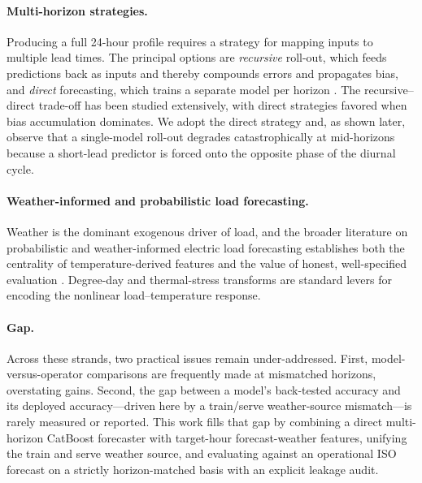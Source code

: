 \paragraph{Multi-horizon strategies.} Producing a full 24-hour profile requires
a strategy for mapping inputs to multiple lead times. The principal options are
\emph{recursive} roll-out, which feeds predictions back as inputs and thereby
compounds errors and propagates bias, and \emph{direct} forecasting, which
trains a separate model per horizon \cite{taieb2016bias}. The recursive--direct
trade-off has been studied extensively, with direct strategies favored when bias
accumulation dominates. We adopt the direct strategy and, as shown later,
observe that a single-model roll-out degrades catastrophically at mid-horizons
because a short-lead predictor is forced onto the opposite phase of the diurnal
cycle.

\paragraph{Weather-informed and probabilistic load forecasting.} Weather is the
dominant exogenous driver of load, and the broader literature on probabilistic
and weather-informed electric load forecasting establishes both the centrality
of temperature-derived features and the value of honest, well-specified
evaluation \cite{hong2016probabilistic}. Degree-day and thermal-stress
transforms are standard levers for encoding the nonlinear load--temperature
response.

\paragraph{Gap.} Across these strands, two practical issues remain
under-addressed. First, model-versus-operator comparisons are frequently made at
mismatched horizons, overstating gains. Second, the gap between a model's
back-tested accuracy and its deployed accuracy---driven here by a train/serve
weather-source mismatch---is rarely measured or reported. This work fills that
gap by combining a direct multi-horizon CatBoost forecaster with target-hour
forecast-weather features, unifying the train and serve weather source, and
evaluating against an operational ISO forecast on a strictly horizon-matched
basis with an explicit leakage audit.
